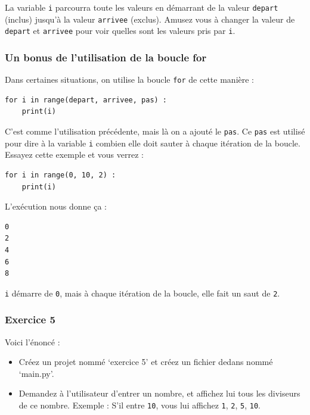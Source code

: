 \documentclass[12pt]{article}
\newcommand{\code}[1]{\colorbox{light-gray}{\texttt{#1}}}
\begin{document}
            La variable \code{i} parcourra toute les valeurs en démarrant de la valeur \code{depart} (inclus) 
            jusqu'à la valeur \code{arrivee} (exclus). Amusez vous à changer la valeur de \code{depart}
            et \code{arrivee} pour voir quelles sont les valeurs pris par \code{i}.

        \subsubsection{Un bonus de l'utilisation de la boucle for}

            Dans certaines situations, on utilise la boucle \code{for} de cette manière :
            \begin{lstlisting}[style=code]
for i in range(depart, arrivee, pas) :
    print(i)
            \end{lstlisting}

            C'est comme l'utilisation précédente, mais là on a ajouté le \code{pas}. Ce \code{pas} est utilisé pour dire à 
            la variable \code{i} combien elle doit sauter à chaque itération de la boucle. Essayez cette exemple et vous 
            verrez :
            \begin{lstlisting}[style=code]
for i in range(0, 10, 2) :
    print(i)
            \end{lstlisting}

            L'exécution nous donne ça :
            \begin{lstlisting}[style=exec_result]
0
2
4
6
8
            \end{lstlisting}

            \code{i} démarre de \code{0}, mais à chaque itération de la boucle, elle fait un saut de \code{2}.

        \subsubsection{Exercice 5}
            Voici l'énoncé :
            \begin{itemize}
                \item Créez un projet nommé `exercice 5' et créez un fichier dedans nommé `main.py'.
                \item Demandez à l'utilisateur d'entrer un nombre, et affichez lui tous les diviseurs de ce nombre. 
                    Exemple : S'il entre \code{10}, vous lui affichez \code{1}, \code{2}, \code{5}, \code{10}.
            \end{itemize}
\end{document}
